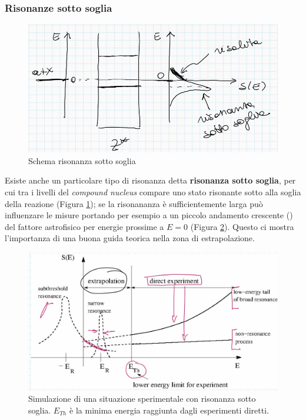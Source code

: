 \subsubsection{Risonanze sotto soglia}
\begin{figure}[h]
    \centering
    \includegraphics[scale=0.8]{Immagini/0325_risonanza4.1.png}
    \caption{Schema risonanza sotto soglia}
    \label{0325_ris41}
\end{figure}
\noindent Esiste anche un particolare tipo di risonanza detta \textbf{risonanza sotto soglia}, per cui tra i livelli del \textit{compound nucleus} compare uno stato risonante sotto alla soglia della reazione (Figura \ref{0325_ris41}); se la risonananza è sufficientemente larga può influenzare le misure portando per esempio a un piccolo andamento crescente () del fattore astrofisico per energie prossime a $E=0$ (Figura \ref{0325_ris4}). Questo ci mostra l'importanza di una buona guida teorica nella zona di estrapolazione.

\begin{figure}[h]
    \centering
    \includegraphics[scale=0.3]{Immagini/0325_risonanza4.png}
    \caption{Simulazione di una situazione sperimentale con risonanza sotto soglia. $E_{Th}$ è la minima energia raggiunta dagli esperimenti diretti.}
    \label{0325_ris4}
\end{figure}
\newpage
